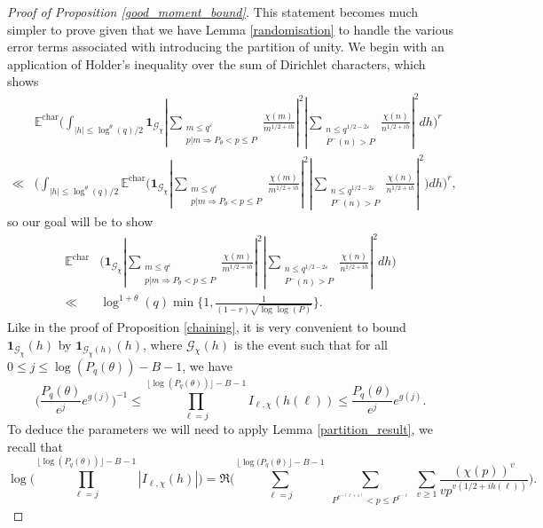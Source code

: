 \documentclass[reqno]{amsart}
\theoremstyle{definition}
\theoremstyle{remark}
\numberwithin{equation}{section}
\theoremstyle{remark}
\begin{document}
\begin{proof}[Proof of Proposition \ref{good_moment_bound}]
    This statement becomes much simpler to prove given that we have Lemma \ref{randomisation} to handle the various error terms associated with introducing the partition of unity. We begin with an application of Holder's inequality over the sum of Dirichlet characters, which shows
    \begin{align*}
        &\mathbb{E}^{\text{char}}\big(\int_{|h| \leq \log^\theta(q)/2} \mathbf{1}_{\mathcal{G}_\chi}|\sum_{\substack{m \leq q^\varepsilon \\ p|m \Rightarrow P_\theta < p \leq P}}\frac{\chi(m)}{m^{1/2+ih}}|^2|\sum_{\substack{n \leq q^{1/2-2\varepsilon} \\ P^{-}(n) > P}}\frac{\chi(n)}{n^{1/2+ih}}|^2dh\big)^r \\
        \ll&\big(\int_{|h| \leq \log^\theta(q)/2} \mathbb{E}^{\text{char}}\big(\mathbf{1}_{\mathcal{G}_\chi}|\sum_{\substack{m \leq q^\varepsilon \\ p|m \Rightarrow P_\theta < p \leq P}}\frac{\chi(m)}{m^{1/2+ih}}|^2|\sum_{\substack{n \leq q^{1/2-2\varepsilon} \\ P^{-}(n) > P}}\frac{\chi(n)}{n^{1/2+ih}}|^2\big)dh\big)^r,
    \end{align*}
    so our goal will be to show
    \begin{align*}
        \mathbb{E}^{\text{char}}&\big(\mathbf{1}_{\mathcal{G}_\chi}|\sum_{\substack{m \leq q^\varepsilon \\ p|m \Rightarrow P_\theta < p \leq P}}\frac{\chi(m)}{m^{1/2+ih}}|^2|\sum_{\substack{n \leq q^{1/2-2\varepsilon} \\ P^{-}(n) > P}}\frac{\chi(n)}{n^{1/2+ih}}|^2dh\big) \\ \ll& \log^{1+\theta}(q)\min\big\{1,\frac{1}{(1-r)\sqrt{\log\log(P)}}\big\}.
    \end{align*}
    Like in the proof of Proposition \ref{chaining}, it is very convenient to bound $\mathbf{1}_{\mathcal{G}_\chi}(h)$ by $\mathbf{1}_{\mathcal{G}_\chi(h)}(h)$, where $\mathcal{G}_\chi(h)$ is the event such that for all $0 \leq j \leq \log(P_q(\theta)) - B -1$, we have
$$\big(\frac{P_q(\theta)}{e^j}e^{g(j)}\big)^{-1} \leq \prod_{\ell=j}^{\lfloor\log(P_q(\theta))\rfloor-B-1}I_{\ell,\chi}(h(\ell))\leq \frac{P_q(\theta)}{e^j}e^{g(j)}.$$
To deduce the parameters we will need to apply Lemma \ref{partition_result}, we recall that
$$\log\big(\prod_{\ell=j}^{\lfloor\log(P_q(\theta))\rfloor - B -1}|I_{\ell,\chi}(h)|\big) = \Re\big(\sum_{\ell=j}^{\lfloor\log(P_q(\theta)\rfloor - B -1}\sum_{\substack{P^{e^{-(\ell+1)}} < p \leq P^{e^{-\ell}}}}\sum_{v \geq 1}\frac{(\chi(p))^v}{vp^{v(1/2+ih(\ell))}}\big).$$

\end{proof}
\end{document}
